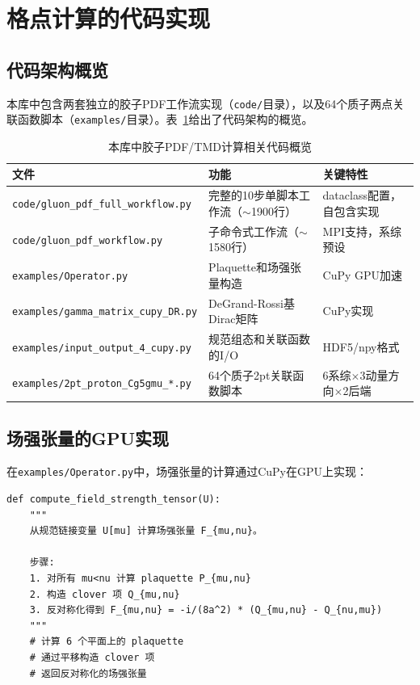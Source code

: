 \documentclass[12pt,a4paper]{ctexart}
\theoremstyle{definition}
\begin{document}

\section{格点计算的代码实现}

\subsection{代码架构概览}

本库中包含两套独立的胶子PDF工作流实现（\texttt{code/}目录），以及64个质子两点关联函数脚本（\texttt{examples/}目录）。表~\ref{tab:code_structure}给出了代码架构的概览。

\begin{table}[H]
\centering
\caption{本库中胶子PDF/TMD计算相关代码概览}
\label{tab:code_structure}
\begin{tabular}{lp{7cm}p{4cm}}
\toprule
文件 & 功能 & 关键特性 \\
\midrule
\texttt{code/gluon\_pdf\_full\_workflow.py} & 完整的10步单脚本工作流（$\sim$1900行） & dataclass配置，自包含实现 \\
\texttt{code/gluon\_pdf\_workflow.py} & 子命令式工作流（$\sim$1580行） & MPI支持，系综预设 \\
\texttt{examples/Operator.py} & Plaquette和场强张量构造 & CuPy GPU加速 \\
\texttt{examples/gamma\_matrix\_cupy\_DR.py} & DeGrand-Rossi基Dirac矩阵 & CuPy实现 \\
\texttt{examples/input\_output\_4\_cupy.py} & 规范组态和关联函数的I/O & HDF5/npy格式 \\
\texttt{examples/2pt\_proton\_Cg5gmu\_*.py} & 64个质子2pt关联函数脚本 & 6系综$\times$3动量方向$\times$2后端 \\
\bottomrule
\end{tabular}
\end{table}

\subsection{场强张量的GPU实现}

在\texttt{examples/Operator.py}中，场强张量的计算通过CuPy在GPU上实现：

\begin{verbatim}
def compute_field_strength_tensor(U):
    """
    从规范链接变量 U[mu] 计算场强张量 F_{mu,nu}。

    步骤:
    1. 对所有 mu<nu 计算 plaquette P_{mu,nu}
    2. 构造 clover 项 Q_{mu,nu}
    3. 反对称化得到 F_{mu,nu} = -i/(8a^2) * (Q_{mu,nu} - Q_{nu,mu})
    """
    # 计算 6 个平面上的 plaquette
    # 通过平移构造 clover 项
    # 返回反对称化的场强张量
\end{verbatim}
\end{document}
